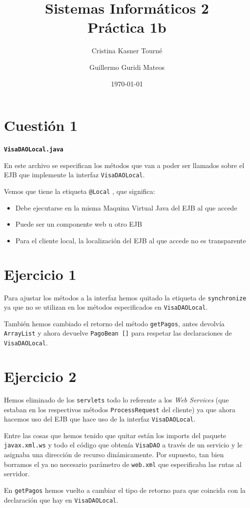 \documentclass[a4paper, 10pt]{article}
\title{Sistemas Informáticos 2\\Práctica 1b}
\author{Cristina Kasner Tourné\and Guillermo Guridi Mateos}
\date{\today}
\begin{document}

\section{Cuestión 1}\texttt{\textbf{VisaDAOLocal.java}}

	En este archivo se especifican los métodos que van a poder ser llamados sobre el EJB que implemente la interfaz \texttt{VisaDAOLocal}.

	Vemos que tiene la etiqueta \texttt{@Local} , que significa:
	\begin{itemize}
		\item Debe ejecutarse en la misma Maquina Virtual Java del EJB al que accede
		\item Puede ser un componente web u otro EJB
		\item Para el cliente local, la localización del EJB al que accede no es transparente
	\end{itemize}


\section{Ejercicio 1}

	Para ajustar los métodos a la interfaz hemos quitado la etiqueta de \texttt{synchronize} ya que no se utilizan en los métodos especificados en \texttt{VisaDAOLocal}.

	También hemos cambiado el retorno del método \texttt{getPagos}, antes devolvía \texttt{ArrayList} y ahora devuelve \texttt{PagoBean []} para respetar las declaraciones de \texttt{VisaDAOLocal}.

	\section{Ejercicio 2}
	Hemos eliminado de los \texttt{servlets} todo lo referente a los \textit{Web Services} (que estaban en los respectivos métodos \texttt{ProcessRequest} del cliente) ya que ahora hacemos uso del EJB que hace uso de la interfaz \texttt{VisaDAOLocal}.

	Entre las cosas que hemos tenido que quitar están los imports del paquete \texttt{javax.xml.ws} y todo el código que obtenía \texttt{VisaDAO} a través de un servicio y le asignaba una dirección de recurso dinámicamente. Por supuesto, tan bien borramos el ya no necesario parámetro de \texttt{web.xml} que especificaba las rutas al servidor.

	En \texttt{getPagos} hemos vuelto a cambiar el tipo de retorno para que coincida con la declaración que hay en \texttt{VisaDAOLocal}.
\end{document}
